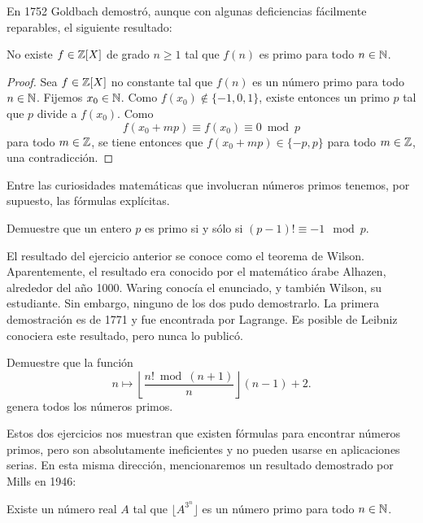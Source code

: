 En 1752 Goldbach demostró,
aunque con algunas deficiencias fácilmente reparables, el siguiente resultado:

\begin{theorem}[Goldbach]
	No existe $f\in\mathbb{Z}[X]$ de grado $n\geq1$ tal que $f(n)$ es primo para todo
	$n\in\mathbb{N}$.
\end{theorem}

\begin{proof}
	Sea $f\in\mathbb{Z}[X]$ no constante tal que $f(n)$ es un número primo para todo
	$n\in\mathbb{N}$. Fijemos $x_0\in\mathbb{N}$. Como $f(x_0)\not\in\{-1,0,1\}$, existe
	entonces un primo $p$ tal que $p$ divide a $f(x_0)$. Como
	\[
		f(x_0+mp)\equiv f(x_0)\equiv 0\bmod p
	\]
	para todo $m\in\mathbb{Z}$, se tiene entonces que $f(x_0+mp)\in\{-p,p\}$ para todo
	$m\in\mathbb{Z}$, una contradicción.
\end{proof}

Entre las curiosidades matemáticas que involucran números primos tenemos, por
supuesto, las fórmulas explícitas. 

\begin{exercise}
	Demuestre que un entero $p$ es primo si y sólo si
	$(p-1)!\equiv -1\mod p$. 
\end{exercise}

El resultado del ejercicio anterior se conoce como el teorema de Wilson.
Aparentemente, el resultado era conocido por el matemático árabe Alhazen,
alrededor del año 1000. Waring conocía el enunciado, y también Wilson, su
estudiante. Sin embargo, ninguno de los dos pudo demostrarlo. La primera
demostración es de 1771 y fue encontrada por Lagrange. Es posible de Leibniz
conociera este resultado, pero nunca lo publicó.



\begin{exercise}
	Demuestre que la función 
	\[
		n\mapsto \left\lfloor\frac{n!\bmod (n+1)}{n}\right\rfloor (n-1)+2.
	\]
	genera todos los números primos. 
\end{exercise}

Estos dos ejercicios nos muestran que existen fórmulas para encontrar números
primos, pero son absolutamente ineficientes y no pueden usarse en aplicaciones
serias. En esta misma dirección, mencionaremos un resultado demostrado por
Mills en 1946:

\begin{theorem}[Mills]
	Existe un número real $A$ tal que $\lfloor A^{3^n}\rfloor$ es un número
	primo para todo $n\in\mathbb{N}$.	
\end{theorem}


